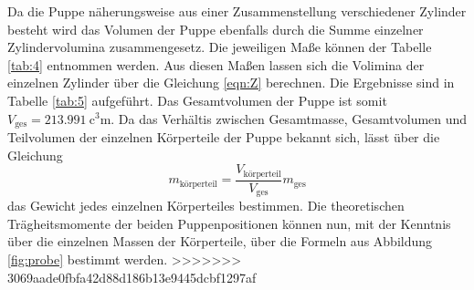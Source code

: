 Da die Puppe näherungsweise aus einer Zusammenstellung verschiedener Zylinder besteht wird das Volumen der Puppe ebenfalls durch die Summe einzelner Zylindervolumina zusammengesetz. Die jeweiligen Maße können der Tabelle \ref{tab:4} entnommen werden. Aus diesen Maßen lassen sich die Volimina der einzelnen Zylinder über die Gleichung \eqref{eqn:Z} berechnen. Die Ergebnisse sind in Tabelle \ref{tab:5} aufgeführt.
Das Gesamtvolumen der Puppe ist somit $V_{\text{ges}}=\SI{213.991}{\cubic\centi\m}$. 
Da das Verhältis zwischen Gesamtmasse, Gesamtvolumen und Teilvolumen der einzelnen Körperteile der Puppe bekannt sich, lässt über die Gleichung
\begin{equation}
    m_{\text{körperteil}}=\frac{V_{\text{körperteil}}}{V_{\text{ges}}}m_{\text{ges}}
\end{equation}
das Gewicht jedes einzelnen Körperteiles bestimmen. 
Die theoretischen Trägheitsmomente der beiden Puppenpositionen können nun, mit der Kenntnis über die einzelnen Massen der Körperteile, über die Formeln aus Abbildung \ref{fig:probe} bestimmt werden. 
>>>>>>> 3069aade0fbfa42d88d186b13e9445dcbf1297af

